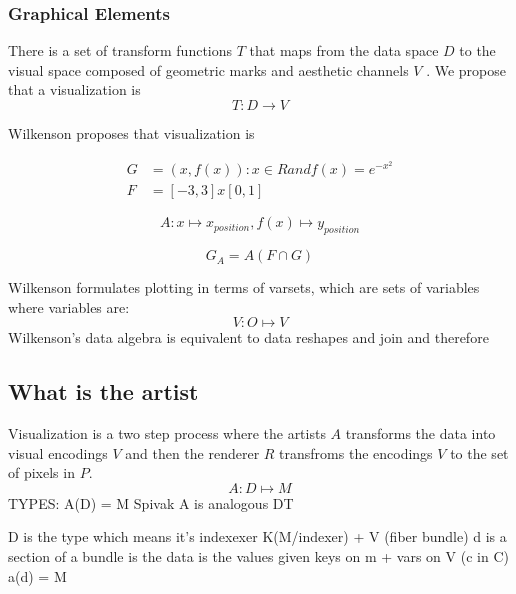 \subsubsection{Graphical Elements}
There is a set of transform functions $T$ that maps from the data space $D$ to the visual space composed of geometric marks and aesthetic channels $V$ \cite{bertinIIPropertiesGraphic2011, munznerMarksChannels}.  We propose that a visualization is 
\begin{equation}
    T: D \rightarrow V
\end{equation}

Wilkenson proposes  that visualization is  \cite{wilkinsonGrammarGraphics2005, wilkinsonMathematicalFoundationAnalytic2010}

\begin{align}
\label{eq:gog_data_range}
G &= {(x, f(x)): x \in R and f(x)=e^{-x^2}}\\
F &= [-3,3] x [0,1]
\end{align}

\begin{equation}
\label{eq:gog_aesthetic_mapping}
A: x \mapsto x_{position}, f(x) \mapsto y_{position}
\end{equation}

\begin{equation}
G_{A} = A(F \cap G) 
\end{equation}

Wilkenson formulates plotting in terms of varsets, which are sets of variables where variables are:
\begin{equation}
V:O\mapsto V    
\end{equation}
Wilkenson's data algebra is equivalent to data reshapes and join and therefore \cite{wickhamLayeredGrammarGraphics2010,wilkinsonGrammarGraphics2005}


\subsection{What is the artist}
Visualization is a two step process where the artists $A$ transforms the data into visual encodings $V$ and then the renderer $R$ transfroms the encodings $V$ to the set of pixels in $P$.
\begin{equation}
    \label{eq:artist}
    A: D \mapsto M
\end{equation}
TYPES: A(D) = M
Spivak A is analogous DT

D is the type  which means it's indexexer K(M/indexer) + V (fiber bundle)
d is a section of a bundle is the data is the values given keys on m + vars on V (c in C)
a(d) = M


